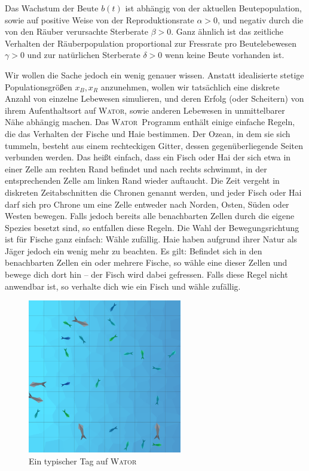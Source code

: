 \documentclass[a4paper,11pt]{article}
\newcommand{\wator}{\textsc{Wator}}
\theoremstyle{definition}
\numberwithin{equation}{section}
\begin{document}
	Das Wachstum der Beute $b(t)$ ist abhängig von der aktuellen Beutepopulation, sowie auf positive Weise von der Reproduktionsrate $\alpha > 0$, und negativ durch die von den Räuber verursachte Sterberate $\beta > 0$. Ganz ähnlich ist das zeitliche Verhalten der Räuberpopulation proportional zur Fressrate pro Beutelebewesen $\gamma > 0$ und zur natürlichen Sterberate $\delta > 0$ wenn keine Beute vorhanden ist. \newline

	Wir wollen die Sache jedoch ein wenig genauer wissen. Anstatt idealisierte stetige Populationsgrößen $x_B, x_R$ anzunehmen, wollen wir tatsächlich eine diskrete Anzahl von einzelne Lebewesen simulieren, und deren Erfolg (oder Scheitern) von ihrem Aufenthaltsort auf \wator, sowie anderen Lebewesen in unmittelbarer Nähe abhängig machen. Das \wator\ Programm enthält einige einfache Regeln, die das Verhalten der Fische und Haie bestimmen. Der Ozean, in dem sie sich tummeln, besteht aus einem rechteckigen Gitter, dessen gegenüberliegende Seiten verbunden werden. Das heißt einfach, dass ein Fisch oder Hai der sich etwa in einer Zelle am rechten Rand befindet und nach rechts schwimmt, in der entsprechenden Zelle am linken Rand wieder auftaucht. Die Zeit vergeht in diskreten Zeitabschnitten die Chronen genannt werden, und jeder Fisch oder Hai darf sich pro Chrone um eine Zelle entweder nach Norden, Osten, Süden oder Westen bewegen. Falls jedoch bereits alle benachbarten Zellen durch die eigene Spezies besetzt sind, so entfallen diese Regeln. Die Wahl der Bewegungsrichtung ist für Fische ganz einfach: Wähle zufällig. Haie haben aufgrund ihrer Natur als Jäger jedoch ein wenig mehr zu beachten. Es gilt: Befindet sich in den benachbarten Zellen ein oder mehrere Fische, so wähle eine dieser Zellen und bewege dich dort hin -- der Fisch wird dabei gefressen. Falls diese Regel nicht anwendbar ist, so verhalte dich wie ein Fisch und wähle zufällig. \newline

	\begin{figure}
		\centering
		\includegraphics[width=0.6\textwidth]{pictures/classic2.png}
		\caption{Ein typischer Tag auf \wator}
		\label{fig:wator}
	\end{figure}
\end{document}

